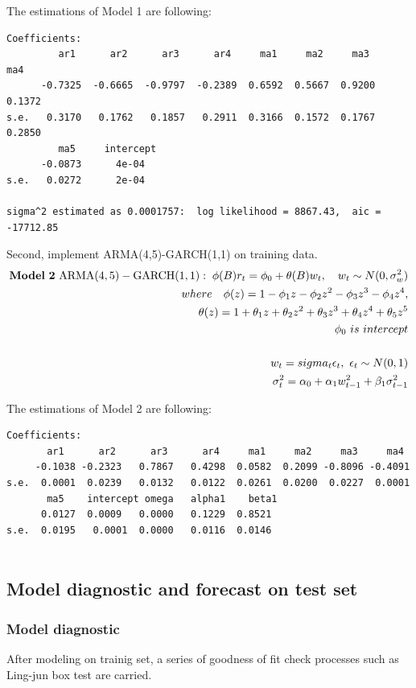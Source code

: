 \documentclass [letterpaper] {article}
\begin{document}
The estimations of Model 1 are following:
\begin{lstlisting}
Coefficients:
         ar1      ar2      ar3      ar4     ma1     ma2     ma3     ma4
      -0.7325  -0.6665  -0.9797  -0.2389  0.6592  0.5667  0.9200  0.1372
s.e.   0.3170   0.1762   0.1857   0.2911  0.3166  0.1572  0.1767  0.2850
         ma5     intercept
      -0.0873      4e-04
s.e.   0.0272      2e-04

sigma^2 estimated as 0.0001757:  log likelihood = 8867.43,  aic = -17712.85
\end{lstlisting}	

Second, implement ARMA(4,5)-GARCH(1,1) on training data.
\begin{equation}
\begin{aligned}
\mathrm{\bold{Model\ 2}\ ARMA(4,5)-GARCH(1,1)}:\; \phi(B)r_t = \phi_0+\theta (B)w_t, \quad w_t \sim N(0, \sigma_{w}^2)\\
where\quad  \phi(z)=1-\phi_1z-\phi_2z^2-\phi_3z^3-\phi_4z^4,\\ \theta(z)=1+\theta_1z+\theta_2z^2+\theta_3z^3+\theta_4z^4+\theta_5z^5\\
\phi_0\ is\ intercept\\\\
w_t=sigma_t\epsilon_t, \ \epsilon_t \sim N(0,1)\\
\sigma_{t}^2=\alpha_0+\alpha_1w_{t-1}^2+\beta_1\sigma_{t-1}^2
\end{aligned}
\end{equation}

The estimations of Model 2 are following:
\begin{lstlisting}
Coefficients:
       ar1      ar2      ar3      ar4     ma1     ma2     ma3     ma4
     -0.1038 -0.2323   0.7867   0.4298  0.0582  0.2099 -0.8096 -0.4091 
s.e.  0.0001  0.0239   0.0132   0.0122  0.0261  0.0200  0.0227  0.0001
       ma5    intercept omega   alpha1    beta1
      0.0127  0.0009   0.0000   0.1229  0.8521
s.e.  0.0195   0.0001  0.0000   0.0116  0.0146


\end{lstlisting}	
	

\subsection{Model diagnostic and forecast on test set}
\subsubsection{Model diagnostic}
After modeling on trainig set, a series  of goodness of fit check processes such as Ling-jun box test are carried. 
\end{document}
